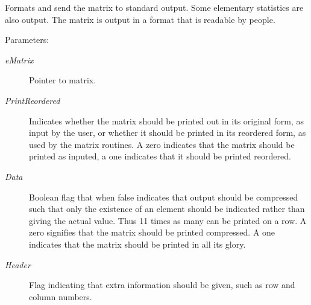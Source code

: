 Formats and send the matrix to standard output. Some elementary statistics are also output. The matrix is output in a format that is readable by people.\begin{Desc}
\item[Parameters: ]\par
\begin{description}
\item[{\em 
e\-Matrix}]Pointer to matrix. \item[{\em 
Print\-Reordered}]Indicates whether the matrix should be printed out in its original form, as input by the user, or whether it should be printed in its reordered form, as used by the matrix routines. A zero indicates that the matrix should be printed as inputed, a one indicates that it should be printed reordered. \item[{\em 
Data}]Boolean flag that when false indicates that output should be compressed such that only the existence of an element should be indicated rather than giving the actual value. Thus 11 times as many can be printed on a row. A zero signifies that the matrix should be printed compressed. A one indicates that the matrix should be printed in all its glory. \item[{\em 
Header}]Flag indicating that extra information should be given, such as row and column numbers. \end{description}
\end{Desc}
